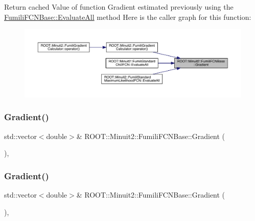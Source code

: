 Return cached Value of function Gradient estimated previously using the \mbox{\hyperlink{classROOT_1_1Minuit2_1_1FumiliFCNBase_a0741bb4a7405cc33ab60583472a189cb}{Fumili\+F\+C\+N\+Base\+::\+Evaluate\+All}} method Here is the caller graph for this function\+:
\nopagebreak
\begin{figure}[H]
\begin{center}
\leavevmode
\includegraphics[width=350pt]{de/dc5/classROOT_1_1Minuit2_1_1FumiliFCNBase_ad226939ea2e83f754b5a6afc30876d3e_icgraph}
\end{center}
\end{figure}
\mbox{\label{classROOT_1_1Minuit2_1_1FumiliFCNBase_a61cd6d04313bf324c6a226e16017ad4f}} 
\subsubsection{\texorpdfstring{Gradient()}{Gradient()}\hspace{0.1cm}{\footnotesize\ttfamily [4/6]}}
{\footnotesize\ttfamily std\+::vector$<$double$>$\& R\+O\+O\+T\+::\+Minuit2\+::\+Fumili\+F\+C\+N\+Base\+::\+Gradient (\begin{DoxyParamCaption}{ }\end{DoxyParamCaption})\hspace{0.3cm}{\ttfamily [inline]}, {\ttfamily [protected]}}

\mbox{\label{classROOT_1_1Minuit2_1_1FumiliFCNBase_a61cd6d04313bf324c6a226e16017ad4f}} 
\subsubsection{\texorpdfstring{Gradient()}{Gradient()}\hspace{0.1cm}{\footnotesize\ttfamily [5/6]}}
{\footnotesize\ttfamily std\+::vector$<$double$>$\& R\+O\+O\+T\+::\+Minuit2\+::\+Fumili\+F\+C\+N\+Base\+::\+Gradient (\begin{DoxyParamCaption}{ }\end{DoxyParamCaption})\hspace{0.3cm}{\ttfamily [inline]}, {\ttfamily [protected]}}

